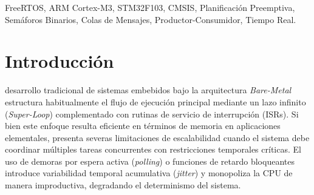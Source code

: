 \documentclass{plantilla}
\begin{document}
\maketitle

\begin{abstract}
En el presente trabajo práctico se aborda el diseño, configuración e implementación de aplicaciones embebidas multitarea en tiempo real sobre el microcontrolador STM32F103C8T6 (núcleo ARM Cortex-M3 @ 72\,MHz) utilizando el sistema operativo FreeRTOS v10.x en conjunto con las librerías CMSIS. En una primera instancia, se analiza la infraestructura de software modular desarrollada como base en el Trabajo Práctico N.º 3, detallando la interacción entre el gestor de memoria dinámica \texttt{heap\_4.c}, la capa portable para ARMv7-M y los manejadores de excepciones del núcleo (\texttt{SVC}, \texttt{PendSV} y \texttt{SysTick}). Posteriormente, en el Ejercicio N.º 1, se implementa un esquema de concurrencia preemptivo por prioridades que integra un parpadeo de LED a 5\,Hz, telemetría periódica por USART1 a 115200\,bps y un monitor de carga de CPU mediante la función \texttt{vApplicationIdleHook()}. Finalmente, en el Ejercicio N.º 2, se resuelve el problema clásico de sincronización y comunicación entre productor y consumidor, coordinando la digitalización periódica de un canal analógico (ADC1 en PA4) mediante un semáforo binario en la rutina de interrupción (\texttt{ADC1\_2\_IRQHandler}) y la transferencia segura de muestras por copia de valor a través de una cola (\textit{Queue}) hacia una tarea consumidora encargada de transmitir los datos procesados por la interfaz serie.
\end{abstract}

\begin{IEEEkeywords}
FreeRTOS, ARM Cortex-M3, STM32F103, CMSIS, Planificación Preemptiva, Semáforos Binarios, Colas de Mensajes, Productor-Consumidor, Tiempo Real.
\end{IEEEkeywords}

\section{Introducción}
 desarrollo tradicional de sistemas embebidos bajo la arquitectura \textit{Bare-Metal} estructura habitualmente el flujo de ejecución principal mediante un lazo infinito (\textit{Super-Loop}) complementado con rutinas de servicio de interrupción (ISRs). Si bien este enfoque resulta eficiente en términos de memoria en aplicaciones elementales, presenta severas limitaciones de escalabilidad cuando el sistema debe coordinar múltiples tareas concurrentes con restricciones temporales críticas. El uso de demoras por espera activa (\textit{polling}) o funciones de retardo bloqueantes introduce variabilidad temporal acumulativa (\textit{jitter}) y monopoliza la CPU de manera improductiva, degradando el determinismo del sistema.
\end{document}
